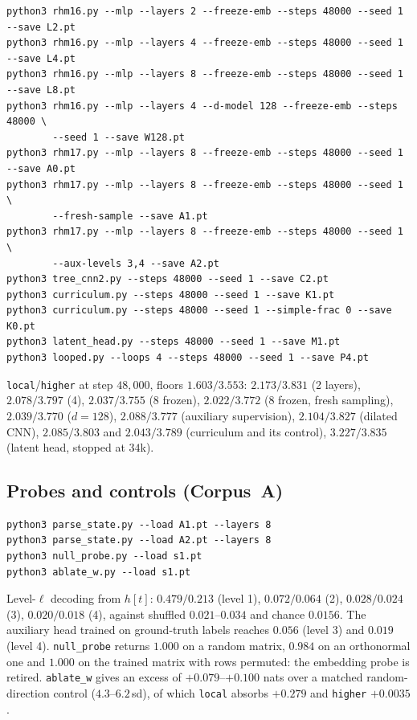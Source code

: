 \begin{verbatim}
python3 rhm16.py --mlp --layers 2 --freeze-emb --steps 48000 --seed 1 --save L2.pt
python3 rhm16.py --mlp --layers 4 --freeze-emb --steps 48000 --seed 1 --save L4.pt
python3 rhm16.py --mlp --layers 8 --freeze-emb --steps 48000 --seed 1 --save L8.pt
python3 rhm16.py --mlp --layers 4 --d-model 128 --freeze-emb --steps 48000 \
        --seed 1 --save W128.pt
python3 rhm17.py --mlp --layers 8 --freeze-emb --steps 48000 --seed 1 --save A0.pt
python3 rhm17.py --mlp --layers 8 --freeze-emb --steps 48000 --seed 1 \
        --fresh-sample --save A1.pt
python3 rhm17.py --mlp --layers 8 --freeze-emb --steps 48000 --seed 1 \
        --aux-levels 3,4 --save A2.pt
python3 tree_cnn2.py --steps 48000 --seed 1 --save C2.pt
python3 curriculum.py --steps 48000 --seed 1 --save K1.pt
python3 curriculum.py --steps 48000 --seed 1 --simple-frac 0 --save K0.pt
python3 latent_head.py --steps 48000 --seed 1 --save M1.pt
python3 looped.py --loops 4 --steps 48000 --seed 1 --save P4.pt
\end{verbatim}
\texttt{local}/\texttt{higher} at step $48{,}000$, floors $1.603/3.553$:
$2.173/3.831$ (2 layers), $2.078/3.797$ (4), $2.037/3.755$ (8 frozen),
$2.022/3.772$ (8 frozen, fresh sampling), $2.039/3.770$ ($d{=}128$),
$2.088/3.777$ (auxiliary supervision), $2.104/3.827$ (dilated CNN),
$2.085/3.803$ and $2.043/3.789$ (curriculum and its control),
$3.227/3.835$ (latent head, stopped at $34$k).

\subsection*{Probes and controls (Corpus~A)}

\begin{verbatim}
python3 parse_state.py --load A1.pt --layers 8
python3 parse_state.py --load A2.pt --layers 8
python3 null_probe.py --load s1.pt
python3 ablate_w.py --load s1.pt
\end{verbatim}
Level-$\ell$ decoding from $h[t]$: $0.479/0.213$ (level 1),
$0.072/0.064$ (2), $0.028/0.024$ (3), $0.020/0.018$ (4), against shuffled
$0.021$--$0.034$ and chance $0.0156$. The auxiliary head trained on
ground-truth labels reaches $0.056$ (level 3) and $0.019$ (level 4).
\texttt{null\_probe} returns $1.000$ on a random matrix, $0.984$ on an
orthonormal one and $1.000$ on the trained matrix with rows permuted: the
embedding probe is retired. \texttt{ablate\_w} gives an excess of
$+0.079$--$+0.100$ nats over a matched random-direction control
($4.3$--$6.2$\,sd), of which \texttt{local} absorbs $+0.279$ and
\texttt{higher} $+0.0035$.

